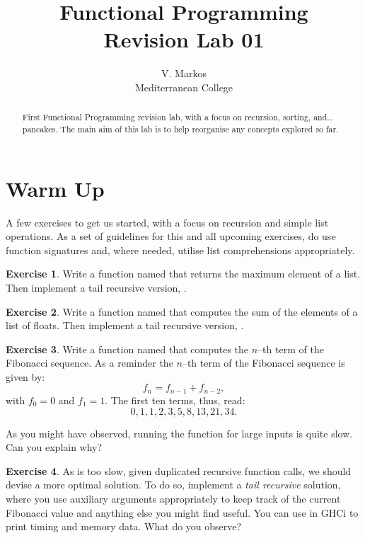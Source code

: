\documentclass[a4paper]{tufte-handout}
\title{Functional Programming\\{\normalsize Revision Lab 01}}
\author{V. Markos\\{\normalsize Mediterranean College}}
\date{}
\theoremstyle{definition}
\newtheorem{exercise}{Exercise}
\begin{document}
	\maketitle
	\begin{abstract}
		First Functional Programming revision lab, with a focus on recursion, sorting, and\ldots pancakes. The main aim of this lab is to help reorganise any concepts explored so far.
	\end{abstract}
	\section{Warm Up}
	A few exercises to get us started, with a focus on recursion and simple list operations. As a set of guidelines for this and all upcoming exercises, do use function signatures and, where needed, utilise list comprehensions appropriately.
	
	\begin{exercise}
		Write a function named  that returns the maximum element of a list. Then implement a tail recursive version, .
	\end{exercise}

	\begin{exercise}
		Write a function named  that computes the sum of the elements of a list of floats. Then implement a tail recursive version, .
	\end{exercise}

	\begin{exercise}
		Write a function named  that computes the $n$--th term of the Fibonacci sequence. As a reminder the $n$--th term of the Fibonacci sequence is given by:
		\begin{equation}
			f_{n}=f_{n-1}+f_{n-2},
		\end{equation}
		with $f_0=0$ and $f_1=1$. The first ten terms, thus, read:
		\[0,1,1,2,3,5,8,13,21,34.\]
	\end{exercise}

	As you might have observed, running the function  for large inputs is quite slow. Can you explain why?
	
	\begin{exercise}
		As  is too slow, given duplicated recursive function calls, we should devise a more optimal solution. To do so, implement a \emph{tail recursive} solution, where you use auxiliary arguments appropriately to keep track of the current Fibonacci value and anything else you might find useful. You can use  in GHCi to print timing and memory data. What do you observe? 
	\end{exercise}
\end{document}
